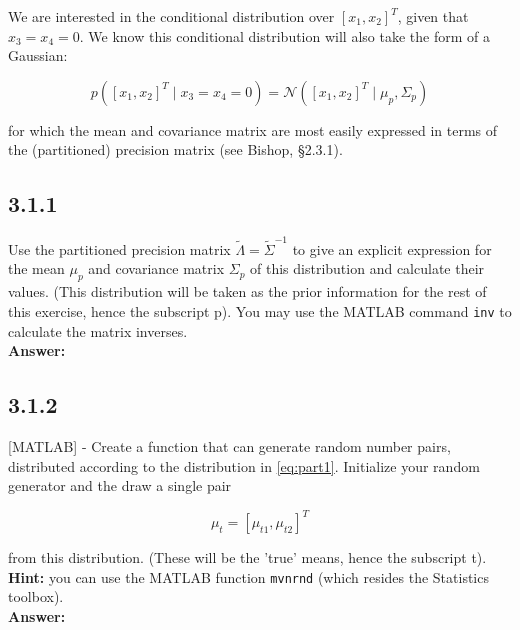 \documentclass[a4paper]{article}
\begin{document}
We are interested in the conditional distribution over $[x_1,x_2]^T$, given that $x_3 = x_4 = 0$. We know this conditional distribution will also take the form of a Gaussian:

\begin{equation}
p([x_1,x_2]^T \; | \; x_3 = x_4 = 0) = \mathcal{N}([x_1,x_2]^T \; | \; \mu_p, \Sigma_p) \label{eq:part1}
\end{equation}

for which the mean and covariance matrix are most easily expressed in terms of the (partitioned) precision matrix (see Bishop, §2.3.1).



\subsection*{3.1.1}

Use the partitioned precision matrix $\tilde{\Lambda} = \tilde{\Sigma}^{-1}$ to give an explicit expression for the mean $\mu_p$ and covariance matrix $\Sigma_p$ of this distribution and calculate their values. (This distribution will be taken as the prior information for the rest of this exercise, hence the subscript p). You may use the MATLAB command \texttt{inv} to calculate the matrix inverses.\\

\textbf{Answer:}\\



\subsection*{3.1.2}

[MATLAB] - Create a function that can generate random number pairs, distributed according to the distribution in \ref{eq:part1}. Initialize your random generator and the draw a single pair

\begin{equation}
	\mu_t = [\mu_{t1}, \mu_{t2}]^T
\end{equation}

from this distribution. (These will be the 'true' means, hence the subscript t).\\

\textbf{Hint:} you can use the MATLAB function \texttt{mvnrnd} (which resides the Statistics toolbox).\\

\textbf{Answer:}\\
\end{document}
